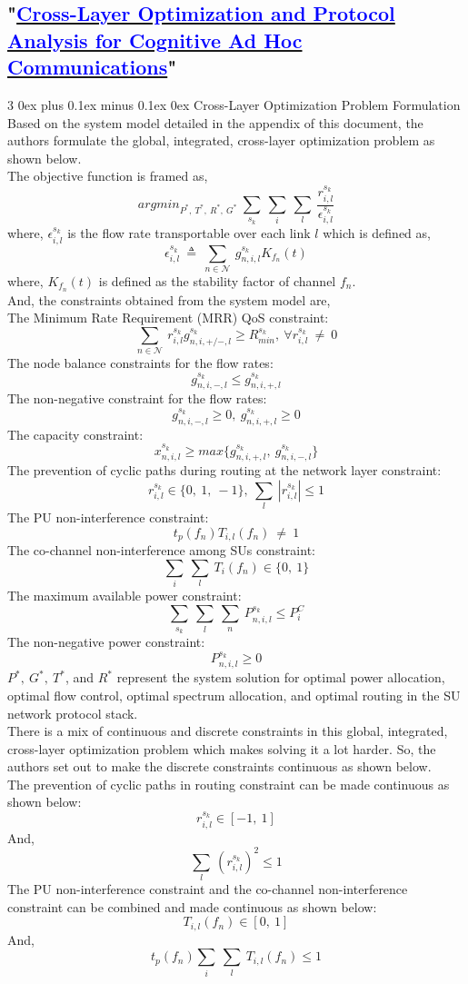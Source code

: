 \documentclass[12pt, draftcls, onecolumn]{IEEEtran}
\makeatletter
\def\subsubsection{\@startsection{subsubsection}%
                                 {3}%
                                 {\z@}%
                                 {0ex plus 0.1ex minus 0.1ex}%
                                 {0ex}%
                                 {\normalfont\normalsize\bfseries}}%
\makeatother
\begin{document}
\subsection{"\href{http://ieeexplore.ieee.org/stamp/stamp.jsp?tp=&arnumber=7859326&isnumber=7859429}{\textcolor{blue}{Cross-Layer Optimization and Protocol Analysis for Cognitive Ad Hoc Communications}}"}
\subsubsection{Cross-Layer Optimization Problem Formulation}
Based on the system model detailed in the appendix of this document, the authors formulate the global, integrated, cross-layer optimization problem as shown below.
\\The objective function is framed as,
\begin{equation}
    argmin_{P^*,\ T^*,\ R^*,\ G^*}\ \sum_{s_k}\ \sum_{i}\ \sum_{l}\ \frac{r_{i,l}^{s_k}}{\epsilon_{i,l}^{s_k}}
\end{equation}
where, $\epsilon_{i,l}^{s_k}$ is the flow rate transportable over each link $l$ which is defined as,
\[\epsilon_{i,l}^{s_k}\ \triangleq\ \sum_{n \in \mathcal{N}}\ g_{n,i,l}^{s_k} K_{f_n}(t)\]
where, $K_{f_n}(t)$ is defined as the stability factor of channel $f_n$.
\\And, the constraints obtained from the system model are,
\\The Minimum Rate Requirement (MRR) QoS constraint:
\[\sum_{n \in \mathcal{N}}\ r_{i,l}^{s_k} g_{n,i,+/-,l}^{s_k} \geq R_{min}^{s_k},\ \forall r_{i,l}^{s_k}\ \not=\ 0\]
The node balance constraints for the flow rates:
\[g_{n,i,-,l}^{s_k} \leq g_{n,i,+,l}^{s_k}\]
The non-negative constraint for the flow rates:
\[g_{n,i,-,l}^{s_k} \geq 0,\ g_{n,i,+,l}^{s_k} \geq 0\]
The capacity constraint:
\[x_{n,i,l}^{s_k} \geq max\{g_{n,i,+,l}^{s_k},\ g_{n,i,-,l}^{s_k}\}\]
The prevention of cyclic paths during routing at the network layer constraint:
\[r_{i,l}^{s_k} \in \{0,\ 1,\ -1\},\ \sum_{l}\ |r_{i,l}^{s_k}| \leq 1\]
The PU non-interference constraint:
\[t_p(f_n) T_{i,l}(f_n)\ \not=\ 1\]
The co-channel non-interference among SUs constraint:
\[\sum_{i}\ \sum_{l}\ T_i(f_n) \in \{0,\ 1\}\]
The maximum available power constraint:
\[\sum_{s_k}\ \sum_{l}\ \sum_{n}\ P_{n,i,l}^{s_k} \leq P_i^C\]
The non-negative power constraint:
\[P_{n,i,l}^{s_k} \geq 0\]
$P^*,\ G^*,\ T^*$, and $R^*$ represent the system solution for optimal power allocation, optimal flow control, optimal spectrum allocation, and optimal routing in the SU network protocol stack.
\\There is a mix of continuous and discrete constraints in this global, integrated, cross-layer optimization problem which makes solving it a lot harder. So, the authors set out to make the discrete constraints continuous as shown below.
\\The prevention of cyclic paths in routing constraint can be made continuous as shown below:
\[r_{i,l}^{s_k} \in [-1,\ 1]\]
And, \[\sum_l\ (r_{i,l}^{s_k})^2 \leq 1\]
The PU non-interference constraint and the co-channel non-interference constraint can be combined and made continuous as shown below:
\[T_{i,l}(f_n) \in [0,\ 1]\]
And, \[t_p(f_n)\sum_i\ \sum_l\ T_{i,l}(f_n) \leq 1\]
\end{document}

